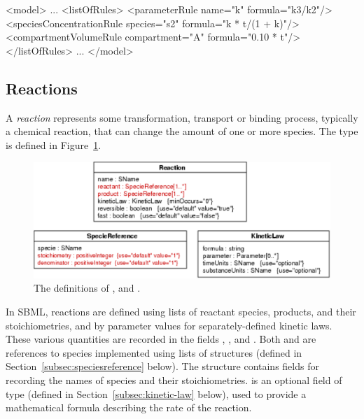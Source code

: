 \documentclass[10pt]{cekarticle}
\newcommand{\vref}[1]{\ref{#1}}
\newcommand{\changed}[1]{\textcolor{BrickRed}{#1}}
\begin{document}
\begin{example}
<model>
    ...
    <listOfRules>
        <parameterRule name="k" formula="k3/k2"/>
        <speciesConcentrationRule species="s2" formula="k * t/(1 + k)"/>
        <compartmentVolumeRule compartment="A" formula="0.10 * t"/>
    </listOfRules>
    ...
</model> 
\end{example}


\subsection{Reactions}
\label{sec:reactions}

A \emph{reaction} represents some transformation, transport or binding
process, typically a chemical reaction, that can change the amount of one
or more species.  The  type is defined in
Figure~\vref{fig:reaction}.  

\begin{figure}[htb]
  \centering
  \vspace*{-5pt}
  \includegraphics[scale = 0.68]{reaction}
  \caption{The definitions of ,  and
    \changed{}.} 
  \label{fig:reaction}
\end{figure}

In SBML, reactions are defined using lists of reactant species, products,
and their stoichiometries, and by parameter values for separately-defined
kinetic laws.  These various quantities are recorded in the fields
, , and .  Both
 and  are references to species
implemented using lists of \changed{} structures
(defined in Section~\ref{subsec:speciesreference} below).  The
\changed{} structure contains fields for recording
the names of species and their stoichiometries.   is an
optional field of type  (defined in
Section~\ref{subsec:kinetic-law} below), used to provide a mathematical
formula describing the rate of the reaction.
\end{document}

